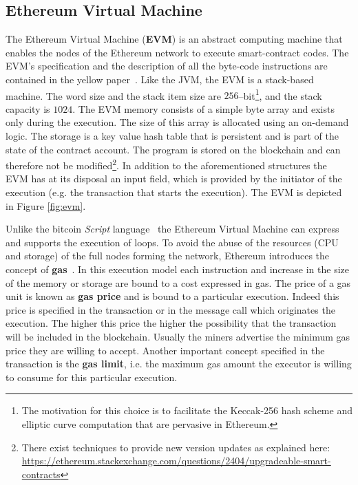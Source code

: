 \subsection{Ethereum Virtual Machine}
The Ethereum Virtual Machine (\textbf{EVM}) is an abstract computing machine
that enables the nodes of the Ethereum network to execute smart-contract
codes.
The EVM's specification and the description of all the byte-code instructions
are contained in the yellow paper~\cite{wood2018ethereum}.
Like the JVM, the EVM is a stack-based machine.
The word size and the stack item size are $256$--bit\footnote{The motivation
for this choice is to facilitate the Keccak-256 hash scheme and elliptic
curve computation that are pervasive in Ethereum.},
and the stack capacity is $1024$.
The EVM memory consists of a simple byte array and exists only during the
execution. The size of this array is allocated using an on-demand logic.
The storage is a key value hash table that is persistent and is
part of the state of the contract account. The program is stored on the
blockchain and can therefore not be modified\footnote{There exist
techniques to provide new version updates as explained
here:
\url{https://ethereum.stackexchange.com/questions/2404/upgradeable-smart-contracts}}.
In addition to the aforementioned structures the EVM has at its
disposal an input field, which is provided by the initiator of the execution
(e.g. the transaction that starts the execution). The EVM is depicted
in Figure \ref{fig:evm}.

Unlike the bitcoin \textit{Script} language~\cite{bib:masteringbitcoin} the
Ethereum Virtual Machine can express and supports the execution of loops.
To avoid the abuse of the resources (CPU and storage) of the full nodes
forming the network, Ethereum introduces the concept of
\textbf{gas}~\cite{wood2018ethereum}. In this
execution model each instruction and increase in the size of the memory or
storage are bound to a cost expressed in gas. The price of a gas unit
is known as \textbf{gas price} and is bound to a particular execution.
Indeed this price is specified in the transaction or in the message call
which originates the execution. The higher this price the higher the
possibility that the  transaction will be included in the blockchain.
Usually the miners advertise the minimum gas price they are willing to accept.
Another important concept specified in the transaction is the
\textbf{gas limit}, i.e. the maximum gas amount the executor is willing to
consume for this particular execution.

